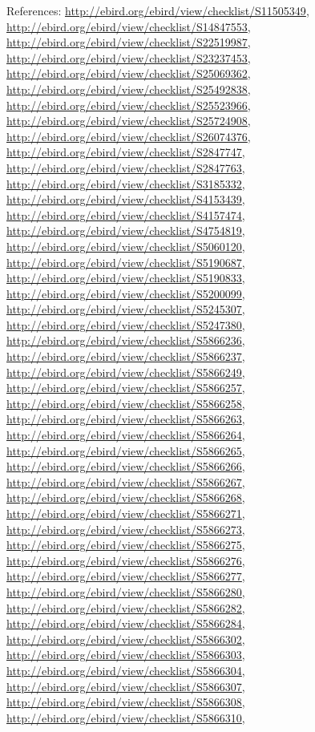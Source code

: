 \documentclass[9pt, article]{memoir}
\begin{document}
\begin{multicols}{2}
\vspace{6pt}References: 
\url{http://ebird.org/ebird/view/checklist/S11505349}, 
\url{http://ebird.org/ebird/view/checklist/S14847553}, 
\url{http://ebird.org/ebird/view/checklist/S22519987}, 
\url{http://ebird.org/ebird/view/checklist/S23237453}, 
\url{http://ebird.org/ebird/view/checklist/S25069362}, 
\url{http://ebird.org/ebird/view/checklist/S25492838}, 
\url{http://ebird.org/ebird/view/checklist/S25523966}, 
\url{http://ebird.org/ebird/view/checklist/S25724908}, 
\url{http://ebird.org/ebird/view/checklist/S26074376}, 
\url{http://ebird.org/ebird/view/checklist/S2847747}, 
\url{http://ebird.org/ebird/view/checklist/S2847763}, 
\url{http://ebird.org/ebird/view/checklist/S3185332}, 
\url{http://ebird.org/ebird/view/checklist/S4153439}, 
\url{http://ebird.org/ebird/view/checklist/S4157474}, 
\url{http://ebird.org/ebird/view/checklist/S4754819}, 
\url{http://ebird.org/ebird/view/checklist/S5060120}, 
\url{http://ebird.org/ebird/view/checklist/S5190687}, 
\url{http://ebird.org/ebird/view/checklist/S5190833}, 
\url{http://ebird.org/ebird/view/checklist/S5200099}, 
\url{http://ebird.org/ebird/view/checklist/S5245307}, 
\url{http://ebird.org/ebird/view/checklist/S5247380}, 
\url{http://ebird.org/ebird/view/checklist/S5866236}, 
\url{http://ebird.org/ebird/view/checklist/S5866237}, 
\url{http://ebird.org/ebird/view/checklist/S5866249}, 
\url{http://ebird.org/ebird/view/checklist/S5866257}, 
\url{http://ebird.org/ebird/view/checklist/S5866258}, 
\url{http://ebird.org/ebird/view/checklist/S5866263}, 
\url{http://ebird.org/ebird/view/checklist/S5866264}, 
\url{http://ebird.org/ebird/view/checklist/S5866265}, 
\url{http://ebird.org/ebird/view/checklist/S5866266}, 
\url{http://ebird.org/ebird/view/checklist/S5866267}, 
\url{http://ebird.org/ebird/view/checklist/S5866268}, 
\url{http://ebird.org/ebird/view/checklist/S5866271}, 
\url{http://ebird.org/ebird/view/checklist/S5866273}, 
\url{http://ebird.org/ebird/view/checklist/S5866275}, 
\url{http://ebird.org/ebird/view/checklist/S5866276}, 
\url{http://ebird.org/ebird/view/checklist/S5866277}, 
\url{http://ebird.org/ebird/view/checklist/S5866280}, 
\url{http://ebird.org/ebird/view/checklist/S5866282}, 
\url{http://ebird.org/ebird/view/checklist/S5866284}, 
\url{http://ebird.org/ebird/view/checklist/S5866302}, 
\url{http://ebird.org/ebird/view/checklist/S5866303}, 
\url{http://ebird.org/ebird/view/checklist/S5866304}, 
\url{http://ebird.org/ebird/view/checklist/S5866307}, 
\url{http://ebird.org/ebird/view/checklist/S5866308}, 
\url{http://ebird.org/ebird/view/checklist/S5866310}, 

\end{multicols}
\end{document}
